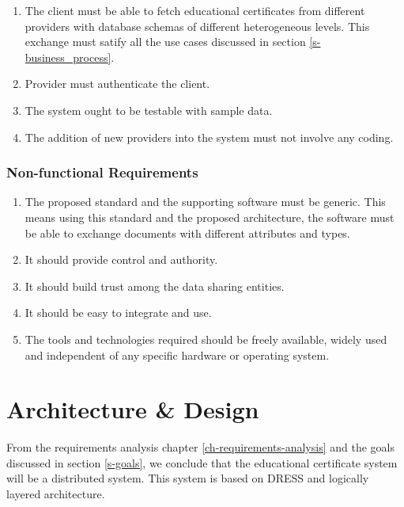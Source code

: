 \documentclass[12pt,a4paper,oneside]{book}
\begin{document}
    \begin{enumerate}

		\item The client must be able to fetch educational certificates from different providers with database schemas of different heterogeneous levels. This exchange must satify all the use cases discussed in section \ref{s-business_process}.

		\item Provider must authenticate the client.
	
		\item The system ought to be testable with sample data.	
		
		\item The addition of new providers into the system must not involve any coding.

	\end{enumerate} 

    \subsection{Non-functional Requirements}

	\begin{enumerate}

		\item The proposed standard and the supporting software must be generic. This means using this standard and the proposed architecture, the software must be able to exchange documents with different attributes and types. 

		\item It should provide control and authority.
	
		\item It should build trust among the data sharing entities. 	
		
		\item It should be easy to integrate and use.
		
		\item The tools and technologies required should be freely available, widely used and independent of any specific hardware or operating system.

	\end{enumerate}

\chapter{Architecture \& Design}\label{ch-architecture-design}
From the requirements analysis chapter \ref{ch-requirements-analysis} and the goals discussed in section \ref{s-goals}, we conclude that the educational certificate system will be a distributed system. This system is based on DRESS and logically layered architecture.
\end{document}
